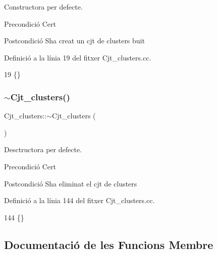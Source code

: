 Constructora per defecte. 

\begin{DoxyPrecond}{Precondició}
Cert 
\end{DoxyPrecond}
\begin{DoxyPostcond}{Postcondició}
S\textquotesingle{}ha creat un cjt de clusters buit 
\end{DoxyPostcond}


Definició a la línia 19 del fitxer Cjt\+\_\+clusters.\+cc.


\begin{DoxyCode}
19 \{\}
\end{DoxyCode}
\mbox{\label{class_cjt__clusters_aba7f00077ce77ba7963ac8084be4a000}} 
\subsubsection{\texorpdfstring{$\sim$\+Cjt\+\_\+clusters()}{~Cjt\_clusters()}}
{\footnotesize\ttfamily Cjt\+\_\+clusters\+::$\sim$\+Cjt\+\_\+clusters (\begin{DoxyParamCaption}{ }\end{DoxyParamCaption})}



Desctructora per defecte. 

\begin{DoxyPrecond}{Precondició}
Cert 
\end{DoxyPrecond}
\begin{DoxyPostcond}{Postcondició}
S\textquotesingle{}ha eliminat el cjt de clusters 
\end{DoxyPostcond}


Definició a la línia 144 del fitxer Cjt\+\_\+clusters.\+cc.


\begin{DoxyCode}
144 \{\}
\end{DoxyCode}


\subsection{Documentació de les Funcions Membre}
\mbox{\label{class_cjt__clusters_afe0ecfc740e82c1c00f549ef12279673}} 
